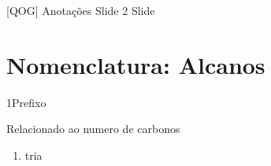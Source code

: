 \documentclass[\mainfilename]{subfiles}
\begin{document}
\graphicspath{{\subfix{./.build/figures/QOG-Slides_Anotações.2}}}

[QOG]
{Anotações Slide 2} %
{Slide} %

\part*{Nomenclatura: Alcanos}

\begin{sectionBox}1{Prefixo} %
    
    Relacionado ao numero de carbonos
    
    \begin{enumerate}
        \setcounter{enumi}{29}
        \item tria
    \end{enumerate}

\end{sectionBox}
\end{document}
